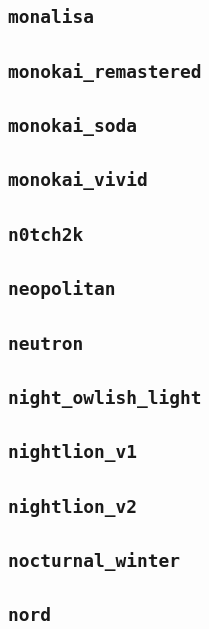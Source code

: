 \subsection{\texttt{monalisa}}
\newpage
\subsection{\texttt{monokai\_remastered}}
\newpage
\subsection{\texttt{monokai\_soda}}
\newpage
\subsection{\texttt{monokai\_vivid}}
\newpage
\subsection{\texttt{n0tch2k}}
\newpage
\subsection{\texttt{neopolitan}}
\newpage
\subsection{\texttt{neutron}}
\newpage
\subsection{\texttt{night\_owlish\_light}}
\newpage
\subsection{\texttt{nightlion\_v1}}
\newpage
\subsection{\texttt{nightlion\_v2}}
\newpage
\subsection{\texttt{nocturnal\_winter}}
\newpage
\subsection{\texttt{nord}}
\newpage
